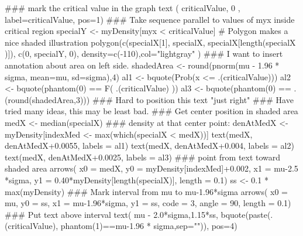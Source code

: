 \begin{Schunk}
\begin{Sinput}
 ### mark the critical value in the graph
 text ( criticalValue, 0 ,
       label=criticalValue, pos=1)
 ### Take sequence parallel to values of myx inside critical region
 specialY <- myDensity[myx < criticalValue]
 #  Polygon makes a nice shaded illustration
 polygon(c(specialX[1], specialX, specialX[length(specialX )]), c(0, specialY, 0), density=c(-110),col="lightgray" )
 ### I want to insert annotation about area on left side.
 shadedArea <- round(pnorm(mu - 1.96 * sigma, mean=mu, sd=sigma),4)
 al1 <- bquote(Prob(x <= .(criticalValue)))
 al2 <- bquote(phantom(0) == F( .(criticalValue) ))
 al3 <- bquote(phantom(0) == .(round(shadedArea,3)))
 ### Hard to position this text "just right"
 ### Have tried many ideas, this may be least bad.
 ### Get center position in shaded area
 medX <- median(specialX)
 ### density at that center point:
 denAtMedX <- myDensity[indexMed <- max(which(specialX < medX))]
 text(medX, denAtMedX+0.0055, labels = al1)
 text(medX, denAtMedX+0.004, labels = al2)
 text(medX, denAtMedX+0.0025, labels = al3)
 ### point from text toward shaded area
 arrows( x0 = medX, y0 = myDensity[indexMed]+0.002,
        x1 = mu-2.5 *sigma, y1 = 0.40*myDensity[length(specialX)], length = 0.1)
 ss <- 0.1 * max(myDensity)
 ### Mark interval from mu to mu-1.96*sigma
 arrows( x0 = mu, y0 = ss, x1 = mu-1.96*sigma, y1 = ss, code = 3, angle = 90, length = 0.1)
 ### Put text above interval
 text( mu - 2.0*sigma,1.15*ss, bquote(paste(.(criticalValue), phantom(1)==mu-1.96 * sigma,sep="")), pos=4)
\end{Sinput}
\end{Schunk}
